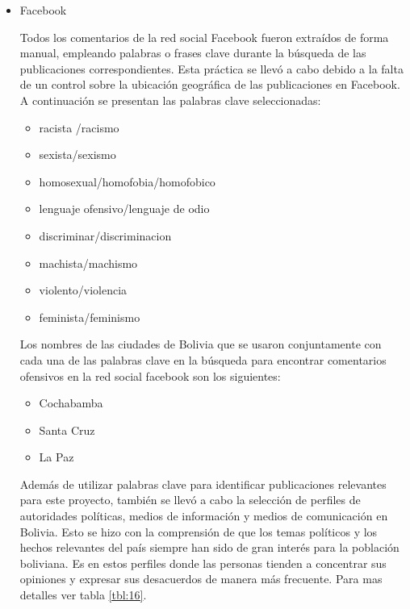 \begin{itemize}

\item Facebook

Todos los comentarios de la red social Facebook fueron extraídos de forma manual, empleando palabras o frases clave durante la búsqueda de las publicaciones correspondientes. Esta práctica se llevó a cabo debido a la falta de un control sobre la ubicación geográfica de las publicaciones en Facebook. A continuación se presentan las palabras clave seleccionadas:
\begin{itemize}
	\item racista /racismo
	\item sexista/sexismo
	\item homosexual/homofobia/homofobico
	\item lenguaje ofensivo/lenguaje de odio 
	\item discriminar/discriminacion
	\item machista/machismo
	\item violento/violencia
	\item feminista/feminismo  
\end{itemize}
Los nombres de las ciudades de Bolivia que se usaron conjuntamente con cada una de las palabras clave en la búsqueda para encontrar comentarios ofensivos en la red social facebook son los siguientes:
\begin{itemize}
	\item Cochabamba
	\item Santa Cruz
	\item La Paz
	
\end{itemize}

Además de utilizar palabras clave para identificar publicaciones relevantes para este proyecto, también se llevó a cabo la selección de perfiles de autoridades políticas, medios de información y medios de comunicación en Bolivia. Esto se hizo con la comprensión de que los temas políticos y los hechos relevantes del país siempre han sido de gran interés para la población boliviana. Es en estos perfiles donde las personas tienden a concentrar sus opiniones y expresar sus desacuerdos de manera más frecuente. Para mas detalles ver tabla \ref{tbl:16}.



\end{itemize}
